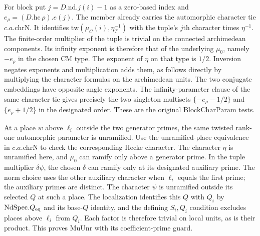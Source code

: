 For $\mathrm{block}$ put $j=D.\mathrm{nd}.j(i)-1$ as a
zero-based index and $e_\rho=(D.\mathrm{hc}\,\rho).e(j)$.
The member already carries the automorphic character tie
$c.a.\mathrm{chrN}$. It identifies
$\mathrm{tw}(\mu_C(i),\eta_T^{-1})$ with the tuple's
$j$th character times $\eta^{-1}$. The finite-order multiplier
of the tuple is trivial on the connected archimedean
components. Its infinity exponent is therefore that of the
underlying $\mu_0$, namely $-e_\rho$ in the chosen CM type.
The exponent of $\eta$ on that type is $1/2$. Inversion
negates exponents and multiplication adds them, as follows
directly by multiplying the character formulas on the
archimedean units. The two conjugate embeddings have opposite
angle exponents. The infinity-parameter clause of the same
character tie gives precisely the two singleton multisets
$\{-e_\rho-1/2\}$ and $\{e_\rho+1/2\}$ in the designated
order. These are the original $\mathrm{BlockCharParam}$ tests.

At a place $w$ above $\ell_i$ outside the two generator
primes, the same twisted rank-one automorphic parameter is
unramified. Use the unramified-place equivalence in
$c.a.\mathrm{chrN}$ to check the corresponding Hecke
character. The character $\eta$ is unramified here, and
$\mu_0$ can ramify only above a generator prime. In the tuple
multiplier $\delta\psi$, the chosen $\delta$ can ramify only
at its designated auxiliary prime. The norm choice uses the
other auxiliary character when $\ell_i$ equals the first
prime; the auxiliary primes are distinct. The character
$\psi$ is unramified outside its selected $Q$ at such a
place. The localization identifies this $Q$ with $Q_i$ by
$\mathrm{NdSpec}.Q_{\rm eq}$ and its base-$Q$ identity, and
the defining $S_i,Q_i$ condition excludes places above
$\ell_i$ from $Q_i$. Each factor is therefore trivial on
local units, as is their product. This proves
$\mathrm{MuUnr}$ with its coefficient-prime guard.

